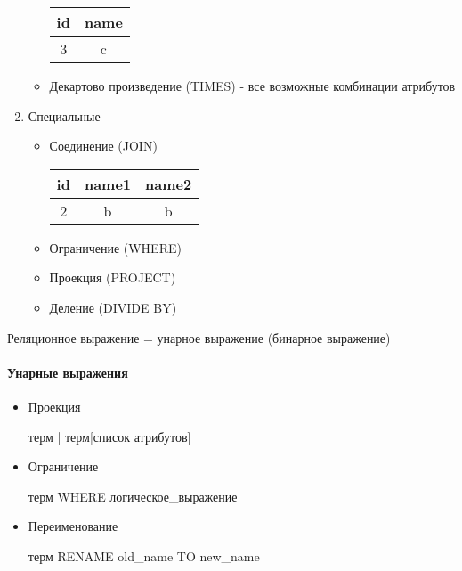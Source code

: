 \documentclass[a4paper, 14pt]{report}
\begin{document}
\begin{enumerate}
\begin{itemize}
                    \begin{tabular}{|c|c|}
                        \hline
                        id & name \\
                        \hline
                        3 & c \\
                        \hline 
                    \end{tabular}

                \item Декартово произведение (TIMES) - все возможные комбинации атрибутов
            \end{itemize}

        \item Специальные

            \begin{itemize}
                \item Соединение (JOIN)

                    \begin{tabular}{|c|c|c|}
                        \hline
                        id & name1 & name2\\
                        \hline
                        2 & b & b \\
                        \hline
                    \end{tabular}

                \item Ограничение (WHERE)
                \item Проекция (PROJECT)
                \item Деление (DIVIDE BY)
            \end{itemize}
    \end{enumerate}

    Реляционное выражение = унарное выражение (бинарное выражение)

    \paragraph{Унарные выражения}

    \begin{itemize}
        \item Проекция

            терм | терм[список атрибутов]

        \item Ограничение

            терм WHERE логическое\_выражение

        \item Переименование

            терм RENAME old\_name TO new\_name

    \end{itemize}
\end{document}
